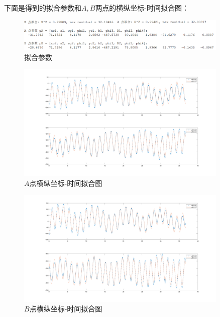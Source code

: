 \documentclass[11pt]{article}
\begin{document}
\begin{enumerate}
\begin{enumerate}
        下面是得到的拟合参数和$A,B$两点的横纵坐标-时间拟合图：
        \begin{figure}[H]
            \centering
            \includegraphics[width=0.9\textwidth]{Figs/Ex2.nums.png}
            \caption{拟合参数}
        \end{figure}
        \vspace{-0.5cm}
        \begin{figure}[H]
            \centering
            \includegraphics[width=0.9\textwidth]{Figs/Ex2.A.png}
            \vspace{-0.1cm}
            \caption{$A$点横纵坐标-时间拟合图}
        \end{figure}
        \vspace{-0.5cm}
        \begin{figure}[H]
            \centering
            \includegraphics[width=0.9\textwidth]{Figs/Ex2.B.png}
            \vspace{-0.1cm}
            \caption{$B$点横纵坐标-时间拟合图}
        \end{figure}

\end{enumerate}
\end{enumerate}
\end{document}
